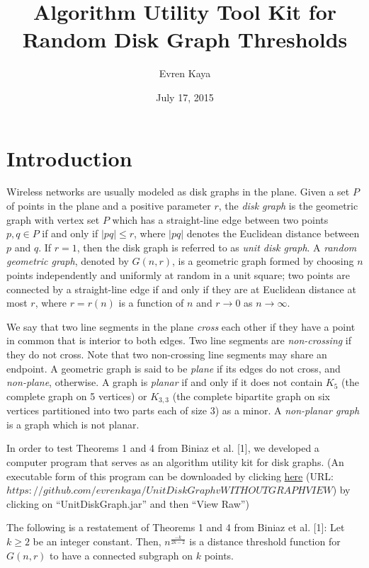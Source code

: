 \documentclass{article}
\title{Algorithm Utility Tool Kit for Random Disk Graph Thresholds}
\author{Evren Kaya}
\date{July 17, 2015}
\newcommand{\dg}{G(n,r)}
\newenvironment{customthm}[1]{\renewcommand\theinnercustomthm{#1}\innercustomthm}{\endinnercustomthm}
\begin{document}
\maketitle

\section{Introduction}
Wireless networks are usually modeled as disk graphs in the plane. Given a set $P$ of points in the plane and a positive parameter $r$, the {\em disk graph} is the geometric graph with vertex set $P$ which has a straight-line edge between two points $p,q\in P$ if and only if $|pq|\le r$, where $|pq|$ denotes the Euclidean distance between $p$ and $q$. If $r=1$, then the disk graph is referred to as {\em unit disk graph}.  
A {\em random geometric graph}, denoted by $\dg$, is a geometric graph formed by choosing $n$ points independently and uniformly at random in a unit square; two points are connected by a straight-line edge if and only if they are at Euclidean distance at most $r$, where $r=r(n)$ is a function of $n$ and $r \to 0$ as $n\to \infty$.

We say that two line segments in the plane {\em cross} each other if they have a point in common that is interior to both edges. Two line segments are {\em non-crossing} if they do not cross. Note that two non-crossing line segments may share an endpoint. A geometric graph is said to be {\em plane} if its edges do not cross, and {\em non-plane}, otherwise. A graph is {\em planar} if and only if it does not contain $K_5$ (the complete graph on 5 vertices) or $K_{3,3}$ (the complete bipartite graph on six vertices partitioned into two parts each of size $3$) as a minor. A {\em non-planar graph} is a graph which is not planar.

In order to test Theorems 1 and 4 from Biniaz et al. [1], we developed a computer program that serves as an algorithm utility kit for disk graphs. (An executable form of this program can be downloaded by clicking \href{https://github.com/evrenkaya/UnitDiskGraphvWITHOUTGRAPHVIEW}{here} (URL: $https://github.com/evrenkaya/UnitDiskGraphvWITHOUTGRAPHVIEW$) by clicking on ``UnitDiskGraph.jar'' and then ``View Raw'')

The following is a restatement of Theorems 1 and 4 from Biniaz et al. [1]:
\begin{customthm}{1}
\label{connected-k-thr}
Let $k\ge 2$ be an integer constant. Then, $n^{\frac{-k}{2k-2}}$ is a distance threshold function for $\dg$ to have a connected subgraph on $k$ points.
\end{customthm}
\end{document}
